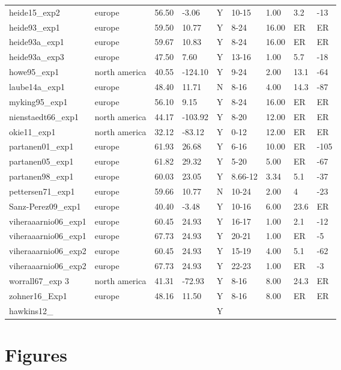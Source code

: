\documentclass{article}
\begin{document}
\begin{table}[ht]
\begin{tabular}{|p{}|p{}|p{}|p{}|p{}|p{}|p{}|p{}|p{}|}
  heide15\_exp2 & europe & 56.50 & -3.06 & Y & 10-15 & 1.00 & 3.2 & -13 \\ 
  heide93\_exp1 & europe & 59.50 & 10.77 & Y & 8-24 & 16.00 & ER & ER \\ 
  heide93a\_exp1 & europe & 59.67 & 10.83 & Y & 8-24 & 16.00 & ER & ER \\ 
  heide93a\_exp3 & europe & 47.50 & 7.60 & Y & 13-16 & 1.00 & 5.7 & -18 \\ 
  howe95\_exp1 & north america & 40.55 & -124.10 & Y & 9-24 & 2.00 & 13.1 & -64 \\ 
  laube14a\_exp1 & europe & 48.40 & 11.71 & N & 8-16 & 4.00 & 14.3 & -87 \\ 
  myking95\_exp1 & europe & 56.10 & 9.15 & Y & 8-24 & 16.00 & ER & ER \\ 
  nienstaedt66\_exp1 & north america & 44.17 & -103.92 & Y & 8-20 & 12.00 & ER & ER \\ 
  okie11\_exp1 & north america & 32.12 & -83.12 & Y & 0-12 & 12.00 & ER & ER \\ 
  partanen01\_exp1 & europe & 61.93 & 26.68 & Y & 6-16 & 10.00 & ER & -105 \\ 
  partanen05\_exp1 & europe & 61.82 & 29.32 & Y & 5-20 & 5.00 & ER & -67 \\ 
  partanen98\_exp1 & europe & 60.03 & 23.05 & Y & 8.66-12 & 3.34 & 5.1 & -37 \\ 
  pettersen71\_exp1 & europe & 59.66 & 10.77 & N & 10-24 & 2.00 & 4 & -23 \\ 
  Sanz-Perez09\_exp1 & europe & 40.40 & -3.48 & Y & 10-16 & 6.00 & 23.6 & ER \\ 
  viheraaarnio06\_exp1 & europe & 60.45 & 24.93 & Y & 16-17 & 1.00 & 2.1 & -12 \\ 
  viheraaarnio06\_exp1 & europe & 67.73 & 24.93 & Y & 20-21 & 1.00 & ER & -5 \\ 
  viheraaarnio06\_exp2 & europe & 60.45 & 24.93 & Y & 15-19 & 4.00 & 5.1 & -62 \\ 
  viheraaarnio06\_exp2 & europe & 67.73 & 24.93 & Y & 22-23 & 1.00 & ER & -3 \\ 
  worrall67\_exp 3 & north america & 41.31 & -72.93 & Y & 8-16 & 8.00 & 24.3 & ER \\ 
  zohner16\_Exp1 & europe & 48.16 & 11.50 & Y & 8-16 & 8.00 & ER & ER \\ 
  hawkins12\_ &  &  &  & Y &  &  &  &  \\ 
   \hline
\end{tabular}
\end{table}\clearpage
\section* {Figures}
\end{document}

